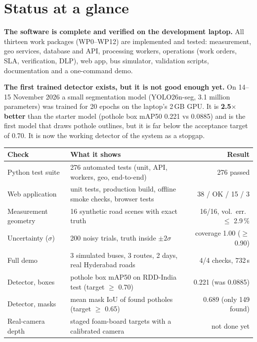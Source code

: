 \documentclass[11pt,a4paper]{article}
\begin{document}
\tableofcontents
\newpage

\section{Status at a glance}\label{sec:summary}

\textbf{The software is complete and verified on the development laptop.} All thirteen work packages (WP0--WP12)
are implemented and tested: measurement, geo services, database and API, processing workers, operations (work
orders, SLA, verification, DLP), web app, bus simulator, validation scripts, documentation and a one-command demo.

\textbf{The first trained detector exists, but it is not good enough yet.} On 14--15 November 2026 a small
segmentation model (YOLO26n-seg, 3.1 million parameters) was trained for 20 epochs on the laptop's 2\,GB GPU. It is
\textbf{2.5$\times$ better} than the starter model (pothole box mAP50 0.221 vs 0.0885) and is the first model that
draws pothole outlines, but it is far below the acceptance target of 0.70. It is now the working detector of the
system as a stopgap.

\begin{center}
\begin{tabularx}{\textwidth}{@{}l X r@{}}
\toprule
\textbf{Check} & \textbf{What it shows} & \textbf{Result}\\
\midrule
Python test suite & 276 automated tests (unit, API, workers, geo, end-to-end) & \textcolor{gmok}{276 passed}\\
Web application & unit tests, production build, offline smoke checks, browser tests & \textcolor{gmok}{38 / OK / 15 / 3}\\
Measurement geometry & 16 synthetic road scenes with exact truth & \textcolor{gmok}{16/16, vol.\ err.\ $\le$ 2.9\,\%}\\
Uncertainty ($\sigma$) & 200 noisy trials, truth inside $\pm2\sigma$ & \textcolor{gmok}{coverage 1.00 ($\ge$ 0.90)}\\
Full demo & 3 simulated buses, 3 routes, 2 days, real Hyderabad roads & \textcolor{gmok}{4/4 checks, 732\,s}\\
Detector, boxes & pothole box mAP50 on RDD-India test (target $\ge$ 0.70) & \textcolor{gmbad}{0.221 (was 0.0885)}\\
Detector, masks & mean mask IoU of found potholes (target $\ge$ 0.65) & \textcolor{gmwarn}{0.689 (only 149 found)}\\
Real-camera depth & staged foam-board targets with a calibrated camera & \textcolor{gmbad}{not done yet}\\
\bottomrule
\end{tabularx}
\end{center}
\end{document}
